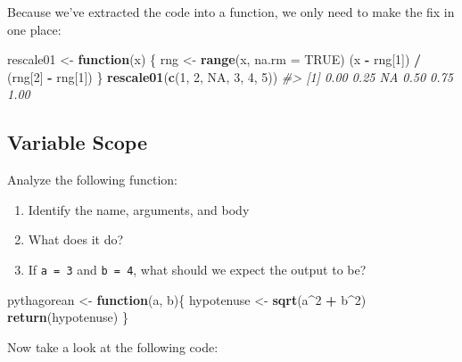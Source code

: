 \documentclass[]{book}
\newenvironment{Shaded}{\begin{snugshade}}{\end{snugshade}}
\newcommand{\KeywordTok}[1]{\textcolor[rgb]{0.13,0.29,0.53}{\textbf{#1}}}
\newcommand{\DataTypeTok}[1]{\textcolor[rgb]{0.13,0.29,0.53}{#1}}
\newcommand{\DecValTok}[1]{\textcolor[rgb]{0.00,0.00,0.81}{#1}}
\newcommand{\StringTok}[1]{\textcolor[rgb]{0.31,0.60,0.02}{#1}}
\newcommand{\CommentTok}[1]{\textcolor[rgb]{0.56,0.35,0.01}{\textit{#1}}}
\newcommand{\OtherTok}[1]{\textcolor[rgb]{0.56,0.35,0.01}{#1}}
\newcommand{\ControlFlowTok}[1]{\textcolor[rgb]{0.13,0.29,0.53}{\textbf{#1}}}
\newcommand{\OperatorTok}[1]{\textcolor[rgb]{0.81,0.36,0.00}{\textbf{#1}}}
\newcommand{\NormalTok}[1]{#1}
\providecommand{\tightlist}{%
  \setlength{\itemsep}{0pt}\setlength{\parskip}{0pt}}
\begin{document}
Because we've extracted the code into a function, we only need to make
the fix in one place:

\begin{Shaded}
\begin{Highlighting}[]
\NormalTok{rescale01 <-}\StringTok{ }\ControlFlowTok{function}\NormalTok{(x) \{}
\NormalTok{  rng <-}\StringTok{ }\KeywordTok{range}\NormalTok{(x, }\DataTypeTok{na.rm =} \OtherTok{TRUE}\NormalTok{)}
\NormalTok{  (x }\OperatorTok{-}\StringTok{ }\NormalTok{rng[}\DecValTok{1}\NormalTok{]) }\OperatorTok{/}\StringTok{ }\NormalTok{(rng[}\DecValTok{2}\NormalTok{] }\OperatorTok{-}\StringTok{ }\NormalTok{rng[}\DecValTok{1}\NormalTok{])}
\NormalTok{\}}
\KeywordTok{rescale01}\NormalTok{(}\KeywordTok{c}\NormalTok{(}\DecValTok{1}\NormalTok{, }\DecValTok{2}\NormalTok{, }\OtherTok{NA}\NormalTok{, }\DecValTok{3}\NormalTok{, }\DecValTok{4}\NormalTok{, }\DecValTok{5}\NormalTok{))}
\CommentTok{#> [1] 0.00 0.25   NA 0.50 0.75 1.00}
\end{Highlighting}
\end{Shaded}

\subsection{Variable Scope}\label{variable-scope}

Analyze the following function:

\begin{enumerate}
\def\labelenumi{\arabic{enumi}.}
\tightlist
\item
  Identify the name, arguments, and body
\item
  What does it do?
\item
  If \texttt{a\ =\ 3} and \texttt{b\ =\ 4}, what should we expect the
  output to be?
\end{enumerate}

\begin{Shaded}
\begin{Highlighting}[]
\NormalTok{pythagorean <-}\StringTok{ }\ControlFlowTok{function}\NormalTok{(a, b)\{}
\NormalTok{  hypotenuse <-}\StringTok{ }\KeywordTok{sqrt}\NormalTok{(a}\OperatorTok{^}\DecValTok{2} \OperatorTok{+}\StringTok{ }\NormalTok{b}\OperatorTok{^}\DecValTok{2}\NormalTok{)}
  \KeywordTok{return}\NormalTok{(hypotenuse)}
\NormalTok{\}}
\end{Highlighting}
\end{Shaded}

Now take a look at the following code:
\end{document}
